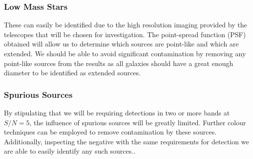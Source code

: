		    \subsubsection*{Low Mass Stars} %
		    \label{sub:low_mass_stars}
		        These can easily be identified due to the high resolution imaging provided by the telescopes that will be chosen for investigation. The point-spread function (PSF) obtained will allow us to determine which sources are point-like and which are extended. We should be able to avoid significant contamination by removing any point-like sources from the results as all galaxies should have a great enough diameter to be identified as extended sources.

		    \subsubsection*{Spurious Sources} %
		    \label{sub:spurious_sources}
		        By stipulating that we will be requiring detections in two or more bands at $S/N=5$, the influence of spurious sources will be greatly limited. Further colour techniques can be employed to remove contamination by these sources. Additionally, inspecting the negative with the same requirements for detection we are able to easily identify any such sources.\cite{Bouwens2011}.

